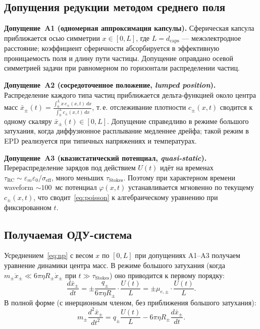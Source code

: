 \subsection*{Допущения редукции методом среднего поля}

\textbf{Допущение~A1 (одномерная аппроксимация капсулы).} Сферическая капсула
приближается осью симметрии $x \in [0, L]$, где $L = d_{\mathrm{caps}}$ —
межэлектродное расстояние; коэффициент сферичности абсорбируется
в эффективную проницаемость поля и длину пути частицы. Допущение оправдано
осевой симметрией задачи при равномерном по горизонтали распределении частиц.

\textbf{Допущение~A2 (сосредоточенное положение, \emph{lumped position}).}
Распределение каждого типа частиц приближается дельта-функцией около центра
масс
$\bar{x}_\pm(t) = \frac{\int_0^L x\, c_\pm(x, t)\, dx}{\int_0^L c_\pm(x, t)\, dx}$,
т.\,е. отслеживание плотности $c_\pm(x, t)$ сводится к одному скаляру
$\bar{x}_\pm(t) \in [0, L]$. Допущение справедливо в режиме большого затухания,
когда диффузионное расплывание медленнее дрейфа; такой режим в EPD реализуется
при типичных напряжениях и температурах.

\textbf{Допущение~A3 (квазистатический потенциал, \emph{quasi-static}).}
Перераспределение зарядов под действием $U(t)$ идёт на временах
$\tau_{\mathrm{RC}} \sim \varepsilon_m \varepsilon_0 / \sigma_{\mathrm{eff}}$,
много меньших $\tau_{\mathrm{Stokes}}$. Поэтому при характерном времени
waveform $\sim 100$~мс потенциал $\varphi(x, t)$ устанавливается
мгновенно по текущему $c_\pm(x, t)$, что сводит~\eqref{eq:poisson}
к алгебраическому уравнению при фиксированном $t$.

\subsection*{Получаемая ОДУ-система}

Усреднением~\eqref{eq:np} с весом $x$ по $[0, L]$ при допущениях A1--A3 получаем
уравнение динамики центра масс. В режиме большого затухания (когда
$m_\pm \ddot{x}_\pm \ll 6\pi\eta R_\pm \dot{x}_\pm$ при
$t \gg \tau_{\mathrm{Stokes}}$) оно приводится к первому порядку:
\begin{equation}\label{eq:ode-position}
    \frac{d\bar{x}_\pm}{dt}
    = \pm \frac{q_\pm}{6\pi \eta R_\pm} \cdot \frac{U(t)}{L}
    = \pm \mu_{e,\pm} \cdot \frac{U(t)}{L}.
\end{equation}
В полной форме (с инерционным членом, без приближения большого затухания):
\begin{equation}\label{eq:ode-full}
    m_\pm \frac{d^2 \bar{x}_\pm}{dt^2}
    = q_\pm \frac{U(t)}{L} - 6\pi \eta R_\pm \frac{d\bar{x}_\pm}{dt}.
\end{equation}

